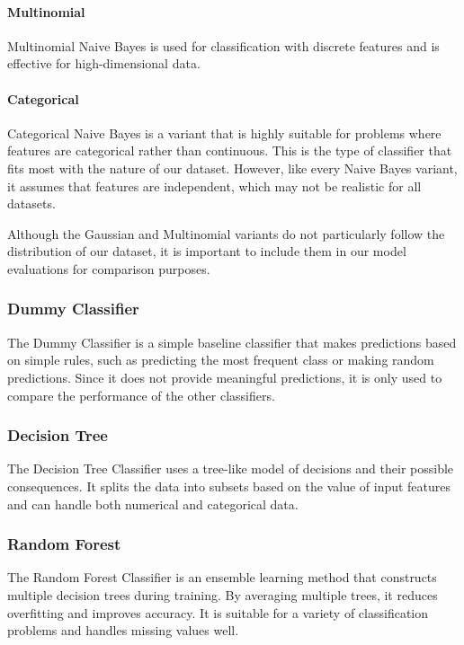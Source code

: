 \documentclass[11pt, conference]{IEEEtran}
\begin{document}
            \paragraph{Multinomial}
            Multinomial Naive Bayes is used for classification with discrete features and is effective for high-dimensional data. 

            \paragraph{Categorical}
            Categorical Naive Bayes is a variant that is highly suitable for problems where features are categorical rather than continuous. This is the type of classifier that fits most with the nature of our dataset. However, like every Naive Bayes variant, it assumes that features are independent, which may not be realistic for all datasets.

            Although the Gaussian and Multinomial variants do not particularly follow the distribution of our dataset, it is important to include them in our model evaluations for comparison purposes.

        \subsubsection{Dummy Classifier}
        The Dummy Classifier is a simple baseline classifier that makes predictions based on simple rules, such as predicting the most frequent class or making random predictions. Since it does not provide meaningful predictions, it is only used to compare the performance of the other classifiers.

        \subsubsection{Decision Tree}
        The Decision Tree Classifier uses a tree-like model of decisions and their possible consequences. It splits the data into subsets based on the value of input features and can handle both numerical and categorical data.

        \subsubsection{Random Forest}
        The Random Forest Classifier is an ensemble learning method that constructs multiple decision trees during training. By averaging multiple trees, it reduces overfitting and improves accuracy. It is suitable for a variety of classification problems and handles missing values well.
    
\end{document}
